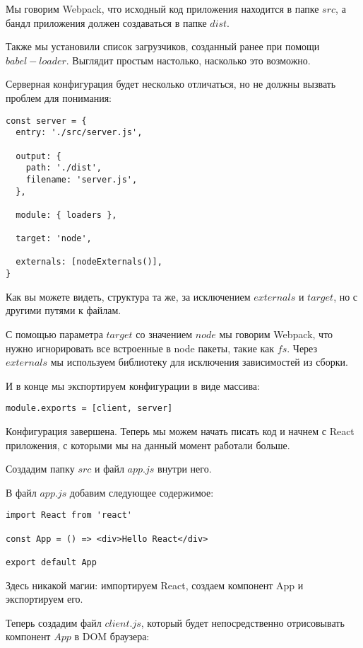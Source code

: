 Мы говорим Webpack, что исходный код приложения находится в папке $src$, а бандл приложения должен создаваться в папке $dist$.

Также мы установили список загрузчиков, созданный ранее при помощи $babel-loader$. Выглядит простым настолько, насколько это возможно.

Серверная конфигурация будет несколько отличаться, но не должны вызвать проблем для понимания:

\begin{lstlisting}
const server = {
  entry: './src/server.js',
  
  output: {
    path: './dist',
    filename: 'server.js',
  },
  
  module: { loaders },
  
  target: 'node',
  
  externals: [nodeExternals()],
}
\end{lstlisting}

Как вы можете видеть, структура та же, за исключением $externals$ и $target$, но с другими путями к файлам.

С помощью параметра $target$ со значением $node$ мы говорим Webpack, что нужно игнорировать все встроенные в node пакеты, такие как $fs$. Через $externals$ мы используем библиотеку для исключения зависимостей из сборки.

И в конце мы экспортируем конфигурации в виде массива:

\begin{lstlisting}
module.exports = [client, server]
\end{lstlisting}

Конфигурация завершена. Теперь мы можем начать писать код и начнем с React приложения, с которыми мы на данный момент работали больше.

Создадим папку $src$ и файл $app.js$ внутри него.

В файл $app.js$ добавим следующее содержимое:

\begin{lstlisting}
import React from 'react'

const App = () => <div>Hello React</div> 

export default App
\end{lstlisting}

Здесь никакой магии: импортируем React, создаем компонент App и экспортируем его.

Теперь создадим файл $client.js$, который будет непосредственно отрисовывать компонент $App$ в DOM браузера:

